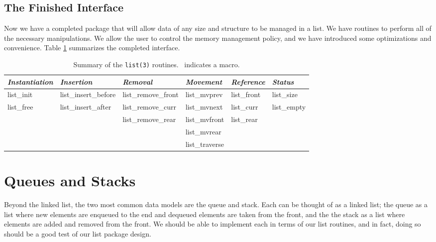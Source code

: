 \subsection{The Finished Interface}
Now we have a completed package that will allow data of any size and structure
to be managed in a list.  We have routines to perform all of the necessary
manipulations.  We allow the user to control the memory management policy,
and we have introduced some optimizations and convenience.  Table
\ref{interface} summarizes the completed interface.
\begin{table}[h]
\begin{centering}
\begin{tabular}{|l|l|l|l|l|l|} \hline
{\em Instantiation} & {\em Insertion} & {\em Removal} & {\em Movement}
& {\em Reference} & {\em Status} \\ \hline

list\_init & list\_insert\_before & list\_remove\_front &
	list\_mvprev   & list\_front\dag & list\_size\dag \\
list\_free & list\_insert\_after  & list\_remove\_curr  &
	list\_mvnext   & list\_curr\dag  & list\_empty\dag \\
           &                      & list\_remove\_rear &
	list\_mvfront\dag  & list\_rear\dag  &             \\
           &                      &                    &
	list\_mvrear\dag   &             &             \\
           &                      &                    &
	list\_traverse &             &             \\ \hline
\end{tabular}
\caption{Summary of the {\tt list(3)} routines. \dag \ indicates a macro.}
\label{interface}
\end{centering}
\end{table}

\section{Queues and Stacks}
Beyond the linked list, the two most common data models are the queue and
stack.  Each can be thought of as a linked list; the queue as a list where new
elements are enqueued to the end and dequeued elements are taken from the
front, and the the stack as a list where elements are added and removed from
the front.  We should be able to implement each in terms of our list routines,
and in fact, doing so should be a good test of our list package design.
